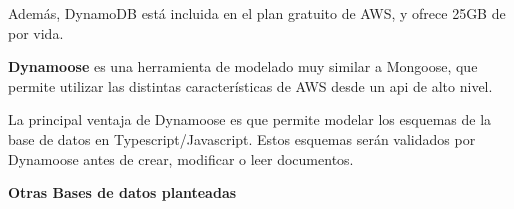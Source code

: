 Además, DynamoDB está incluida en el plan gratuito de AWS, y ofrece 25GB
de por vida.

\textbf{Dynamoose} es una herramienta de modelado muy similar a
Mongoose, que permite utilizar las distintas características de AWS
desde un api de alto nivel.

La principal ventaja de Dynamoose es que permite modelar los esquemas de
la base de datos en Typescript/Javascript. Estos esquemas serán
validados por Dynamoose antes de crear, modificar o leer documentos.

\textbf{Otras Bases de datos planteadas}

    \begin{table}[h]
\end{table}
